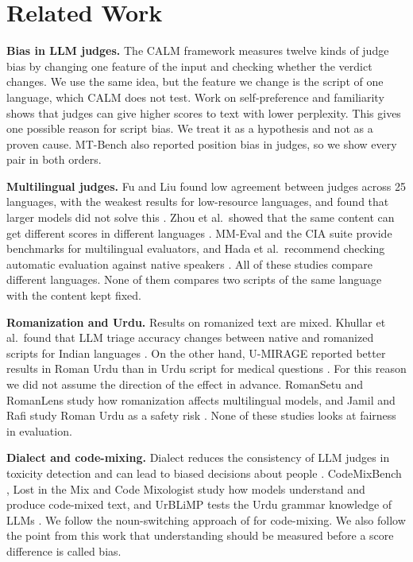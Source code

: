 \documentclass[conference]{IEEEtran}
\begin{document}
\section{Related Work}
\textbf{Bias in LLM judges.} The CALM framework \cite{ye2025justice} measures twelve kinds of judge bias by changing
one feature of the input and checking whether the verdict changes. We use the same idea, but the feature we change is
the script of one language, which CALM does not test. Work on self-preference \cite{panickssery2024llm} and familiarity
\cite{wataoka2024self} shows that judges can give higher scores to text with lower perplexity. This gives one possible
reason for script bias. We treat it as a hypothesis and not as a proven cause. MT-Bench \cite{zheng2023judging} also
reported position bias in judges, so we show every pair in both orders.

\textbf{Multilingual judges.} Fu and Liu found low agreement between judges across 25 languages, with the weakest
results for low-resource languages, and found that larger models did not solve this \cite{fu2025reliable}. Zhou et al.\
showed that the same content can get different scores in different languages \cite{zhou2026lower}. MM-Eval
\cite{son2026mmeval} and the CIA suite \cite{doddapaneni2025cross} provide benchmarks for multilingual evaluators, and
Hada et al.\ recommend checking automatic evaluation against native speakers \cite{hada2024large}. All of these studies
compare different languages. None of them compares two scripts of the same language with the content kept fixed.

\textbf{Romanization and Urdu.} Results on romanized text are mixed. Khullar et al.\ found that LLM triage accuracy
changes between native and romanized scripts for Indian languages \cite{khullar2026script}. On the other hand, U-MIRAGE
reported better results in Roman Urdu than in Urdu script for medical questions \cite{faheem2026umirage}. For this
reason we did not assume the direction of the effect in advance. RomanSetu \cite{husain2024romansetu} and RomanLens
\cite{saji2025romanlens} study how romanization affects multilingual models, and Jamil and Rafi study Roman Urdu as a
safety risk \cite{jamil2026code}. None of these studies looks at fairness in evaluation.

\textbf{Dialect and code-mixing.} Dialect reduces the consistency of LLM judges in toxicity detection
\cite{faisal2025dialectal} and can lead to biased decisions about people \cite{hofmann2024ai}. CodeMixBench
\cite{yang2025codemixbench}, Lost in the Mix \cite{mohamed2025lost} and Code Mixologist \cite{gupta2026code} study how
models understand and produce code-mixed text, and UrBLiMP tests the Urdu grammar knowledge of LLMs
\cite{adeeba2026urblimp}. We follow the noun-switching approach of \cite{mohamed2025lost} for code-mixing. We also
follow the point from this work that understanding should be measured before a score difference is called bias.
\end{document}
